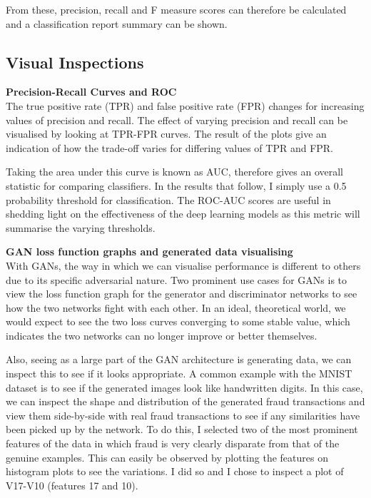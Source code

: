 \documentclass[12pt,a4paper,twoside]{report}
\begin{document}
From these, precision, recall and F measure scores can therefore be calculated and a classification report summary can be shown. 

\subsection{Visual Inspections}

\textbf{Precision-Recall Curves and ROC}\\
The true positive rate (TPR) and false positive rate (FPR) changes for increasing values of precision and recall. The effect of varying precision and recall can be visualised by looking at TPR-FPR curves. The result of the plots give an indication of how the trade-off varies for differing values of TPR and FPR.

Taking the area under this curve is known as AUC, therefore gives an overall statistic for comparing classifiers. In the results that follow, I simply use a 0.5 probability threshold for classification. The ROC-AUC scores are useful in shedding light on the effectiveness of the deep learning models as this metric will summarise the varying thresholds.

\textbf{GAN loss function graphs and generated data visualising}\\
With GANs, the way in which we can visualise performance is different to others due to its specific adversarial nature. Two prominent use cases for GANs is to view the loss function graph for the generator and discriminator networks to see how the two networks fight with each other. In an ideal, theoretical world, we would expect to see the two loss curves converging to some stable value, which indicates the two networks can no longer improve or better themselves. 

Also, seeing as a large part of the GAN architecture is generating data, we can inspect this to see if it looks appropriate. A common example with the MNIST dataset is to see if the generated images look like handwritten digits. In this case, we can inspect the shape and distribution of the generated fraud transactions and view them side-by-side with real fraud transactions to see if any similarities have been picked up by the network. To do this, I selected two of the most prominent features of the data in which fraud is very clearly disparate from that of the genuine examples. This can easily be observed by plotting the features on histogram plots to see the variations. I did so and I chose to inspect a plot of V17-V10 (features 17 and 10).
\end{document}
